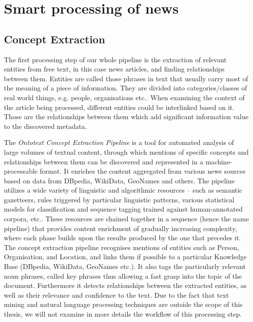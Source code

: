 \chapter{Smart processing of news}
\section{Concept Extraction}
The first processing step of our whole pipeline is the extraction of relevant entities from free text, in this case news articles, and finding relationships between them. Entities are called those phrases in text that usually carry most of the meaning of a piece of information. They are divided into categories/classes of real world things, e.g. people, organisations etc.. When examining the context of the article being processed, different entities could be interlinked based on it. Those are the relationships between them which add significant information value to the discovered metadata. 

The \textit{Ontotext Concept Extraction Pipeline} is a tool for automated analysis of large volumes of textual content, through which mentions of specific concepts and relationships between them can be discovered and represented in a machine-processable format. It enriches the content aggregated from various news sources based on data from DBpedia, WikiData, GeoNames and others. The pipeline utilizes a wide variety of linguistic and algorithmic resources – such as semantic gazetteers, rules triggered by particular linguistic patterns, various statistical models for classification and sequence tagging trained against human-annotated corpora, etc.. These resources are chained together in a sequence (hence the name pipeline) that provides content enrichment of gradually increasing complexity, where each phase builds upon the results produced by the one that precedes it. The concept extraction pipeline recognises mentions of entities such as Person, Organisation, and Location, and links them if possible to a particular Knowledge Base (DBpedia, WikiData, GeoNames etc.). It also tags the particularly relevant noun phrases, called key phrases thus allowing a fast grasp into the topic of the document. Furthermore it detects relationships between the extracted entities, as well as their relevance and confidence to the text. Due to the fact that text mining and natural language processing techniques are outside the scope of this thesis, we will not examine in more details the workflow of this processing step.

